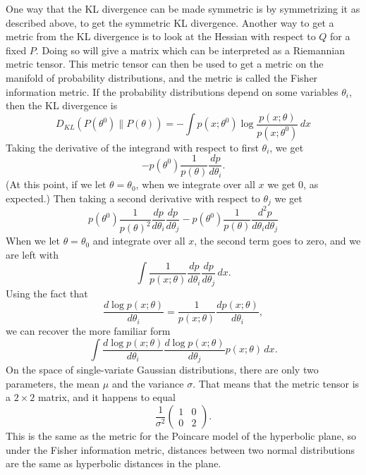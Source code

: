 \documentclass{article}
\begin{document}
One way that the KL divergence can be made symmetric is by symmetrizing it as
described above, to get the symmetric KL divergence. Another way to get a
metric from the KL divergence is to look at the Hessian with respect to $Q$ for
a fixed $P$. Doing so will give a matrix which can be interpreted as a
Riemannian metric tensor. This metric tensor can then be used to get a metric
on the manifold of probability distributions, and the metric is called the
Fisher information metric. If the probability distributions depend on some
variables $\theta_i$, then the KL divergence is
\[
    D_{KL}(P(\theta^0)\| P(\theta))=-\int p(x;\theta^0)\log\frac{p(x;\theta)}{p(x;\theta^0)}\,dx
\]
Taking the derivative of the integrand with respect to first $\theta_i$, we get
\[
    -p(\theta^0)\frac{1}{p(\theta)}\frac{dp}{d\theta_i}.
\]
(At this point, if we let $\theta=\theta_0$, when we integrate over all $x$ we
get $0$, as expected.) Then taking a second derivative with respect to
$\theta_j$ we get
\[
    p(\theta^0)\frac{1}{p(\theta)^2}\frac{dp}{d\theta_i}\frac{dp}{d\theta_j} -p(\theta^0)\frac{1}{p(\theta)}\frac{d^2p}{d\theta_id\theta_j}
\]
When we let $\theta=\theta_0$ and integrate over all $x$, the second term goes
to zero, and we are left with
\[
    \int \frac{1}{p(x;\theta)}\frac{dp}{d\theta_i}\frac{dp}{d\theta_j}\,dx.
\]
Using the fact that
\[
    \frac{d\log p(x;\theta)}{d\theta_i}=\frac{1}{p(x;\theta)}\frac{dp(x;\theta)}{d\theta_i},
\]
we can recover the more familiar form
\[
    \int \frac{d\log p(x;\theta)}{d\theta_i}\frac{d\log p(x;\theta)}{d\theta_j}p(x;\theta)\,dx.
\]
On the space of single-variate Gaussian distributions, there are only two
parameters, the mean $\mu$ and the variance $\sigma$. That means that the
metric tensor is a $2\times 2$ matrix, and it happens to equal
\[
    \frac{1}{\sigma^2}\begin{pmatrix}1&0\\0&2
    \end{pmatrix}.
\]
This is the same as the metric for the Poincare model of the hyperbolic plane,
so under the Fisher information metric, distances between two normal
distributions are the same as hyperbolic distances in the plane.\\
\end{document}
